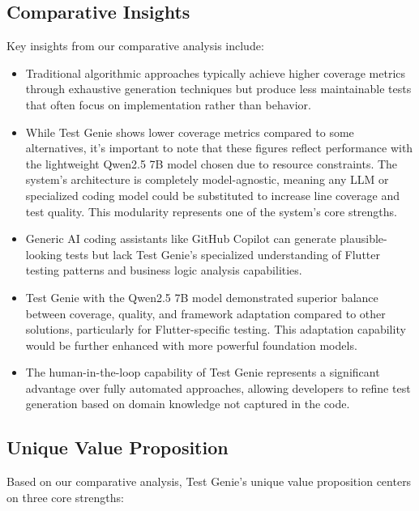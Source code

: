 \subsection{Comparative Insights}

Key insights from our comparative analysis include:

\begin{itemize}
    \item Traditional algorithmic approaches typically achieve higher coverage metrics through exhaustive generation techniques but produce less maintainable tests that often focus on implementation rather than behavior.
    
    \item While Test Genie shows lower coverage metrics compared to some alternatives, it's important to note that these figures reflect performance with the lightweight Qwen2.5 7B model chosen due to resource constraints. The system's architecture is completely model-agnostic, meaning any LLM or specialized coding model could be substituted to increase line coverage and test quality. This modularity represents one of the system's core strengths.
    
    \item Generic AI coding assistants like GitHub Copilot can generate plausible-looking tests but lack Test Genie's specialized understanding of Flutter testing patterns and business logic analysis capabilities.
    
    \item Test Genie with the Qwen2.5 7B model demonstrated superior balance between coverage, quality, and framework adaptation compared to other solutions, particularly for Flutter-specific testing. This adaptation capability would be further enhanced with more powerful foundation models.
    
    \item The human-in-the-loop capability of Test Genie represents a significant advantage over fully automated approaches, allowing developers to refine test generation based on domain knowledge not captured in the code.
\end{itemize}

\subsection{Unique Value Proposition}

Based on our comparative analysis, Test Genie's unique value proposition centers on three core strengths:

